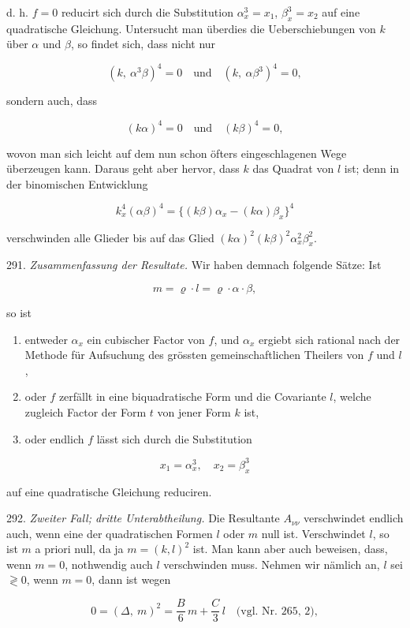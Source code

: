 \documentclass[11pt]{article}
\begin{document}
d. h. $f=0$ reducirt sich durch die Substitution $\alpha_x^3=x_1$, $\beta_x^3=x_2$ auf eine quadratische Gleichung. Untersucht man überdies die Ueberschiebungen von $k$ über $\alpha$ und $\beta$, so findet sich, dass nicht nur

\[ (k,\ \alpha^3\beta)^4=0 \quad \text{und} \quad (k,\ \alpha\beta^3)^4=0, \]

sondern auch, dass

\[ (k\alpha)^4=0 \quad \text{und} \quad (k\beta)^4=0, \]

wovon man sich leicht auf dem nun schon öfters eingeschlagenen Wege überzeugen kann. Daraus geht aber hervor, dass $k$ das Quadrat von $l$ ist; denn in der binomischen Entwicklung

\[ k_x^4(\alpha\beta)^4 = \{(k\beta)\alpha_x - (k\alpha)\beta_x\}^4 \]

verschwinden alle Glieder bis auf das Glied $(k\alpha)^2(k\beta)^2\alpha_x^2\beta_x^2$.

291. \textit{Zusammenfassung der Resultate.} Wir haben demnach folgende Sätze: Ist

\[ m = \varrho \cdot l = \varrho \cdot \alpha \cdot \beta, \]

so ist

\begin{enumerate}
\item[1)] entweder $\alpha_x$ ein cubischer Factor von $f$, und $\alpha_x$ ergiebt sich rational nach der Methode für Aufsuchung des grössten gemeinschaftlichen Theilers von $f$ und $l$,
\item[2)] oder $f$ zerfällt in eine biquadratische Form und die Covariante $l$, welche zugleich Factor der Form $t$ von jener Form $k$ ist,
\item[3)] oder endlich $f$ lässt sich durch die Substitution
\end{enumerate}

\[ x_1 = \alpha_x^3,\quad x_2 = \beta_x^3 \]

auf eine quadratische Gleichung reduciren.

292. \textit{Zweiter Fall; dritte Unterabtheilung.} Die Resultante $A_{\nu\nu}$ verschwindet endlich auch, wenn eine der quadratischen Formen $l$ oder $m$ null ist. Verschwindet $l$, so ist $m$ a priori null, da ja $m=(k,l)^2$ ist. Man kann aber auch beweisen, dass, wenn $m=0$, nothwendig auch $l$ verschwinden muss. Nehmen wir nämlich an, $l$ sei $\gtrless 0$, wenn $m=0$, dann ist wegen

\[ 0 = (\varDelta,\ m)^2 = \frac{B}{6}\, m + \frac{C}{3}\, l \quad \text{(vgl. Nr. 265, 2)}, \]
\end{document}
